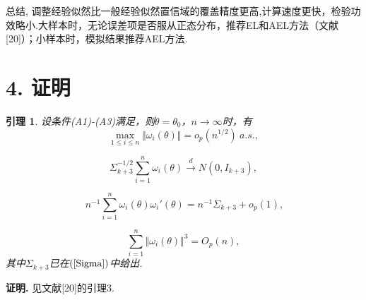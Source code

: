 \documentclass[onecolumn]{ctexart}	%
\begin{document}
总结, 调整经验似然比一般经验似然置信域的覆盖精度更高,计算速度更快，检验功效略小.大样本时，无论误差项是否服从正态分布，推荐EL和AEL方法（文献[20]）；小样本时，模拟结果推荐AEL方法.





\section*{4. 证明}

\newtheorem{lemma}{引理}

\begin{lemma}
设条件(A1)-(A3)满足，则$\theta = \theta_0$，$n \to \infty$时，有
$$
\max_{ 1\leq i\leq n} \Vert  \omega_i(\theta) \Vert=o_p(n^{1/2})  \ a.s., 
 $$

$$
\Sigma_{k+3}^{-1/2}\sum^{n}_{i=1}{\omega_i(\theta)}\stackrel{d}{\longrightarrow}N(0,I_{k+3}),
$$

$$
\ n^{-1}\sum^{n}_{i=1}{\omega_i(\theta)}{\omega_i'(\theta)}=n^{-1}\Sigma_{k+3}+o_p(1) ,
$$
    
$$
\sum^{n}_{i=1}\Vert  \omega_i(\theta) \Vert^3=O_p(n) ,
$$
其中\( \Sigma_{k+3}\)已在\( \rm(\ref{Sigma}) \)中给出.
\end{lemma}

{\bf 证明. }见文献[20]的引理3.
\end{document}
